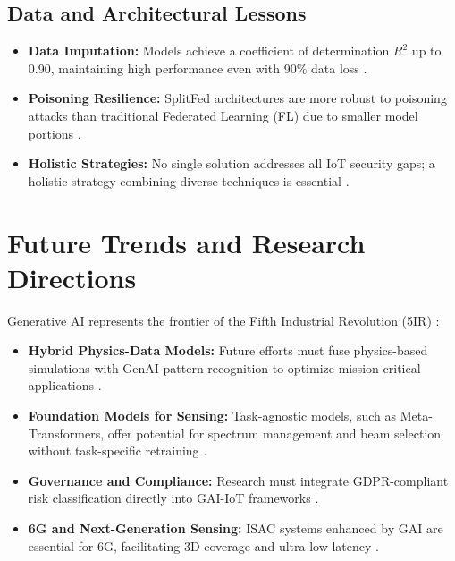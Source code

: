 \documentclass[journal]{IEEEtran}
\begin{document}
\subsection{Data and Architectural Lessons}
\begin{itemize}
    \item \textbf{Data Imputation:} Models achieve a coefficient of determination $R^2$ up to 0.90, maintaining high performance even with 90\% data loss \cite{12}.
    \item \textbf{Poisoning Resilience:} SplitFed architectures are more robust to poisoning attacks than traditional Federated Learning (FL) due to smaller model portions \cite{15}.
    \item \textbf{Holistic Strategies:} No single solution addresses all IoT security gaps; a holistic strategy combining diverse techniques is essential \cite{23}.
\end{itemize}

\section{Future Trends and Research Directions}
Generative AI represents the frontier of the Fifth Industrial Revolution (5IR) \cite{6, 15}:

\begin{itemize}
    \item \textbf{Hybrid Physics-Data Models:} Future efforts must fuse physics-based simulations with GenAI pattern recognition to optimize mission-critical applications \cite{3, 13}.
    \item \textbf{Foundation Models for Sensing:} Task-agnostic models, such as Meta-Transformers, offer potential for spectrum management and beam selection without task-specific retraining \cite{22}.
    \item \textbf{Governance and Compliance:} Research must integrate GDPR-compliant risk classification directly into GAI-IoT frameworks \cite{1, 23}.
    \item \textbf{6G and Next-Generation Sensing:} ISAC systems enhanced by GAI are essential for 6G, facilitating 3D coverage and ultra-low latency \cite{5, 30}.
\end{itemize}
\end{document}
